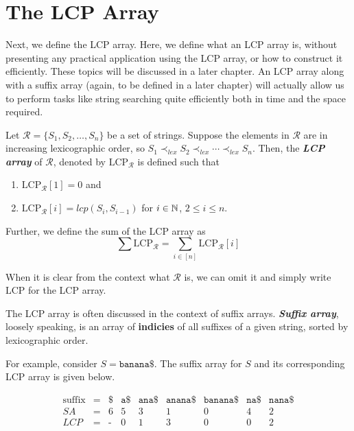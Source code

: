 \section{The LCP Array}

Next, we define the LCP array. Here, we define what an LCP array is, without presenting any practical application using the LCP array, or how to construct it efficiently. These topics will be discussed in a later chapter. An LCP array along with a suffix array (again, to be defined in a later chapter) will actually allow us to perform tasks like string searching quite efficiently both in time and the space required.

\begin{definition}
    Let $\mathcal{R} = \{S_1,S_2,\ldots,S_n\}$ be a set of strings. Suppose the elements in $\mathcal{R}$ are in increasing lexicographic order, so $S_1 \prec_{lex} S_2 \prec_{lex} \cdots \prec_{lex} S_n$. Then, the \textit{\textbf{LCP array}} of $\mathcal{R}$, denoted by $\mathrm{LCP}_{\mathcal{R}}$ is defined such that
    \begin{enumerate}
        \item $\mathrm{LCP}_{\mathcal{R}}[1] = 0$ and
        \item $\mathrm{LCP}_{\mathcal{R}}[i] = \mathit{lcp}(S_i,S_{i-1})$ for $i \in \mathbb{N}$, $2 \leq i \leq n$.
    \end{enumerate}
    Further, we define the sum of the LCP array as
    $$
    \sum \mathrm{LCP}_{\mathcal{R}} = \sum_{i \in [n]} \mathrm{LCP}_{\mathcal{R}}[i]
    $$
\end{definition}

When it is clear from the context what $\mathcal{R}$ is, we can omit it and simply write $\mathrm{LCP}$ for the LCP array.

The LCP array is often discussed in the context of suffix arrays. \textit{\textbf{Suffix array}}, loosely speaking, is an array of \textbf{indicies} of all suffixes of a given string, sorted by lexicographic order.

For example, consider $S = \texttt{banana\$}$. The suffix array for $S$ and its corresponding LCP array is given below.

$$
\begin{array}{ccccccccccc}
    \text{suffix} & = & \texttt{\$} & \texttt{a\$} & \texttt{ana\$} & \texttt{anana\$} & \texttt{banana\$} & \texttt{na\$} & \texttt{nana\$} \\
    SA & = & 6 & 5 & 3 & 1 & 0 & 4 & 2 \\
    LCP & = & \text{-} & 0 & 1 & 3 & 0 & 0 & 2
\end{array}
$$

